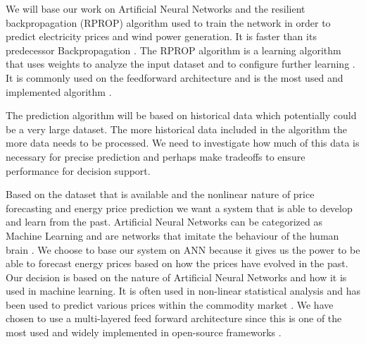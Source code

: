 We will base our work on Artificial Neural Networks and the resilient backpropagation (RPROP) algorithm used to train the network in order to predict electricity prices and wind power generation. It is faster than its predecessor Backpropagation \cite{8,15}.  The RPROP algorithm is a learning algorithm that uses weights to analyze the input dataset and to configure further learning \cite{17}. It is commonly used on the feedforward architecture and is the most used and implemented algorithm \cite{14,17}.

The prediction algorithm will be based on historical data which potentially could be a very large dataset. The more historical data included in the algorithm the more data needs to be processed. We need to investigate how much of this data is necessary for precise prediction and perhaps make tradeoffs to ensure performance for decision support.

Based on the dataset that is available and the nonlinear nature of price forecasting and energy price prediction we want a system that is able to develop and learn from the past. Artificial Neural Networks can be categorized as Machine Learning \cite{18} and are networks that imitate the behaviour of the human brain \cite{1}. We choose to base our system on ANN because it gives us the power to be able to forecast energy prices based on how the prices have evolved in the past. Our decision is based on the nature of Artificial Neural Networks and how it is used in machine learning. It is often used in non-linear statistical analysis \cite{16} and has been used to predict various prices within the commodity market \cite{2,3,stockForecasting,pjmForecast}. We have chosen to use a multi-layered feed forward architecture since this is one of the most used and widely implemented in open-source frameworks \cite{17}.